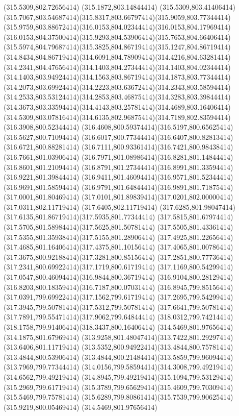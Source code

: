 {{	\lineto(315.5309,802.72656414)
	\lineto(315.1872,803.14844414)
	\lineto(315.5309,803.41406414)
	\curveto(315.7067,803.54687414)(315.8317,803.66797414)(315.9059,803.77344414)
	\curveto(315.9759,803.88672414)(316.0153,804.02344414)(316.0153,804.17969414)
	\curveto(316.0153,804.37500414)(315.9293,804.53906414)(315.7653,804.66406414)
	\curveto(315.5974,804.79687414)(315.3825,804.86719414)(315.1247,804.86719414)
	\curveto(314.8434,804.86719414)(314.6091,804.78909414)(314.4216,804.63281414)
	\curveto(314.2341,804.47656414)(314.1403,804.27344414)(314.1403,804.02344414)
	\curveto(314.1403,803.94924414)(314.1563,803.86719414)(314.1873,803.77344414)
	\curveto(314.2073,803.69924414)(314.2223,803.63672414)(314.2343,803.58594414)
	\curveto(314.2533,803.53124414)(314.2853,803.46875414)(314.3283,803.39844414)
	\curveto(314.3673,803.33594414)(314.4143,803.25781414)(314.4689,803.16406414)
	\curveto(314.5309,803.07816414)(314.6135,802.96875414)(314.7189,802.83594414)
	\lineto(316.3908,800.52344414)
	\curveto(316.4608,800.59374414)(316.5197,800.65625414)(316.5627,800.71094414)
	\curveto(316.6017,800.77344414)(316.6407,800.82813414)(316.6721,800.88281414)
	\curveto(316.7111,800.93361414)(316.7421,800.98438414)(316.7661,801.03906414)
	\curveto(316.7971,801.08986414)(316.8281,801.14844414)(316.8601,801.21094414)
	\curveto(316.8791,801.27344414)(316.8991,801.33594414)(316.9221,801.39844414)
	\curveto(316.9411,801.46094414)(316.9571,801.52344414)(316.9691,801.58594414)
	\curveto(316.9791,801.64844414)(316.9891,801.71875414)(317.0001,801.80469414)
	\curveto(317.0101,801.89839414)(317.0201,802.00000414)(317.0311,802.11719414)
	\lineto(317.6405,802.11719414)
	\curveto(317.6285,801.98047414)(317.6135,801.86719414)(317.5935,801.77344414)
	\curveto(317.5815,801.67974414)(317.5705,801.58984414)(317.5625,801.50781414)
	\curveto(317.5505,801.43361414)(317.5355,801.35938414)(317.5155,801.28906414)
	\curveto(317.4925,801.22656414)(317.4685,801.16406414)(317.4375,801.10156414)
	\curveto(317.4065,801.00786414)(317.3675,800.92188414)(317.3281,800.85156414)
	\curveto(317.2851,800.77736414)(317.2341,800.69922414)(317.1719,800.61719414)
	\curveto(317.1169,800.54299414)(317.0547,800.46094414)(316.9844,800.36719414)
	\curveto(316.9104,800.28129414)(316.8203,800.18359414)(316.7187,800.07031414)
	\curveto(316.8945,799.85156414)(317.0391,799.69922414)(317.1562,799.61719414)
	\curveto(317.2695,799.54299414)(317.3945,799.50781414)(317.5312,799.50781414)
	\curveto(317.6641,799.50781414)(317.7891,799.55471414)(317.9062,799.64844414)
	\curveto(318.0312,799.74214414)(318.1758,799.91406414)(318.3437,800.16406414)
	\closepath
	\moveto(314.5469,801.97656414)
	\lineto(314.1875,801.67969414)
	\curveto(313.9258,801.48047414)(313.7422,801.29297414)(313.6406,801.11719414)
	\curveto(313.5352,800.94922414)(313.4844,800.75781414)(313.4844,800.53906414)
	\curveto(313.4844,800.21484414)(313.5859,799.96094414)(313.7969,799.77344414)
	\curveto(314.0156,799.58594414)(314.3008,799.49219414)(314.6562,799.49219414)
	\curveto(314.8945,799.49219414)(315.1094,799.53129414)(315.2969,799.61719414)
	\curveto(315.3789,799.65629414)(315.4609,799.70309414)(315.5469,799.75781414)
	\curveto(315.6289,799.80861414)(315.7539,799.90625414)(315.9219,800.05469414)
	\closepath
	\moveto(314.5469,801.97656414)
}
}

